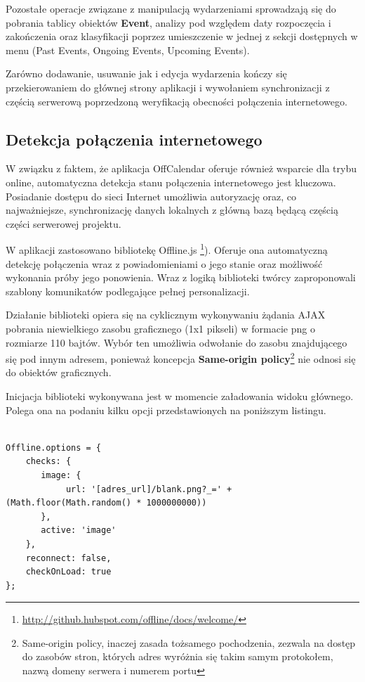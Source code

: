 Pozostałe operacje związane z manipulacją wydarzeniami sprowadzają się do pobrania tablicy obiektów \textbf{Event}, analizy pod względem daty rozpoczęcia i zakończenia oraz klasyfikacji poprzez umieszczenie w jednej z sekcji dostępnych w menu (Past Events, Ongoing Events, Upcoming Events).

Zarówno dodawanie, usuwanie jak i edycja wydarzenia kończy się przekierowaniem do głównej strony aplikacji i wywołaniem synchronizacji z częścią serwerową poprzedzoną weryfikacją obecności połączenia internetowego.

\subsection{Detekcja połączenia internetowego}
\label{sec:detPolInt}

W związku z faktem, że aplikacja OffCalendar oferuje również wsparcie dla trybu online, automatyczna detekcja stanu połączenia internetowego jest kluczowa. Posiadanie dostępu do sieci Internet umożliwia autoryzację oraz, co najważniejsze, synchronizację danych lokalnych z główną bazą będącą częścią części serwerowej projektu.

W aplikacji zastosowano bibliotekę Offline.js \footnote{\url{http://github.hubspot.com/offline/docs/welcome/}}). Oferuje ona automatyczną detekcję połączenia wraz z powiadomieniami o jego stanie oraz możliwość wykonania próby jego ponowienia. Wraz z logiką biblioteki twórcy zaproponowali szablony komunikatów podlegające pełnej personalizacji.

Działanie biblioteki opiera się na cyklicznym wykonywaniu żądania AJAX pobrania niewielkiego zasobu graficznego (1x1 pikseli) w formacie png o rozmiarze 110 bajtów. Wybór ten umożliwia odwołanie do zasobu znajdującego się pod innym adresem, ponieważ koncepcja \textbf{Same-origin policy}\footnote{Same-origin policy, inaczej zasada tożsamego pochodzenia, zezwala na dostęp do zasobów stron, których adres wyróżnia się takim samym protokołem, nazwą domeny serwera i numerem portu} nie odnosi się do obiektów graficznych.

Inicjacja biblioteki wykonywana jest w momencie załadowania widoku głównego. Polega ona na podaniu kilku opcji przedstawionych na poniższym listingu.

\begin{lstlisting}[caption=Inicjalizacja biblioteki Offline.js badającej stan połączenia internetowego., label=amb, captionpos=b]

Offline.options = {
	checks: {
   	   image: {
            url: '[adres_url]/blank.png?_=' + (Math.floor(Math.random() * 1000000000))
       },
       active: 'image'
    },
    reconnect: false,
    checkOnLoad: true
};

\end{lstlisting}

